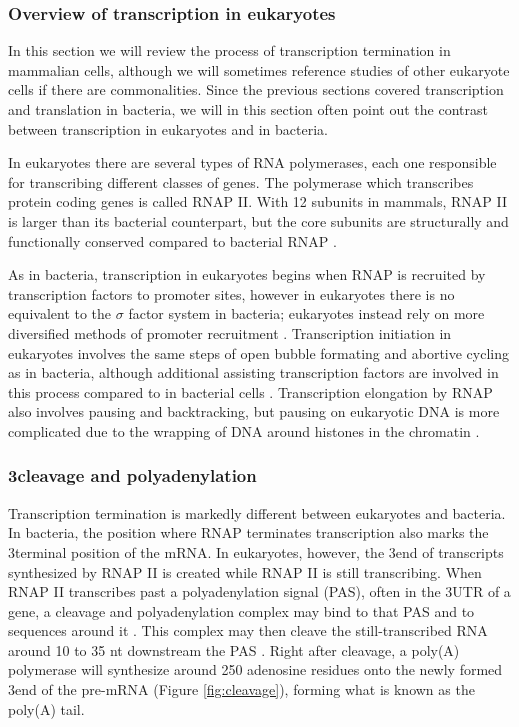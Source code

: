 %
\subsubsection{Overview of transcription in eukaryotes}
In this section we will review the process of transcription termination in
mammalian cells, although we will sometimes reference studies of other
eukaryote cells if there are commonalities. Since the previous sections covered
transcription and translation in bacteria, we will in this section often point
out the contrast between transcription in eukaryotes and in bacteria.

In eukaryotes there are several types of RNA polymerases, each one responsible
for transcribing different classes of genes. The polymerase which transcribes
protein coding genes is called RNAP II. With 12 subunits in mammals, RNAP II is
larger than its bacterial counterpart, but the core subunits are structurally
and functionally conserved compared to bacterial RNAP \cite{ebright_rna_2000}.

As in bacteria, transcription in eukaryotes begins when RNAP is recruited by
transcription factors to promoter sites, however in eukaryotes there is no
equivalent to the $\sigma$ factor system in bacteria; eukaryotes instead rely
on more diversified methods of promoter recruitment
\cite{struhl_fundamentally_1999}. Transcription initiation in eukaryotes
involves the same steps of open bubble formating and abortive cycling as in
bacteria, although additional assisting transcription factors are involved in
this process compared to in bacterial cells \cite{wade_transition_2008}.
Transcription elongation by RNAP also involves pausing and backtracking, but
pausing on eukaryotic DNA is more complicated due to the wrapping of DNA around
histones in the chromatin \cite{sims_elongation_2004}.

\subsubsection{3\protect\ppp cleavage and polyadenylation}
Transcription termination is markedly different between eukaryotes and
bacteria. In bacteria, the position where RNAP terminates transcription also
marks the 3\ppp terminal position of the mRNA. In eukaryotes, however, the
3\ppp end of transcripts synthesized by RNAP II is created while RNAP II is
still transcribing. When RNAP II transcribes past a polyadenylation signal
(PAS), often in the 3\ppp UTR of a gene, a cleavage and polyadenylation complex
may bind to that PAS and to sequences around it \cite{colgan_mechanism_1997}.
This complex may then cleave the still-transcribed RNA around 10 to 35 nt
downstream the PAS \cite{proudfoot_ending_2011}. Right after cleavage, a
poly(A) polymerase will synthesize around 250 adenosine residues onto the newly
formed 3\ppp end of the pre-mRNA (Figure \ref{fig:cleavage}), forming what is
known as the poly(A) tail.

